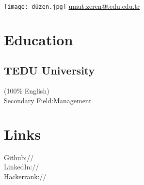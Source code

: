 \documentclass[]{deedy-resume-openfont}
\begin{document}
%
%
\lastupdated

%
%

\texttt{[image: düzen.jpg]} 
{ 
	  \href{umut.zeren@tedu.edu.tr}{umut.zeren@tedu.edu.tr}
}



%
%

\begin{minipage}[t]{0.32\textwidth} 


\section{Education} 

\subsection{TEDU University } \small{(100\% English)}\\[0.1cm]
Secondary Field:Management \\[0.1in]
\sectionsep






\sectionsep
\sectionsep
\sectionsep
\sectionsep
\sectionsep


\section{Links} 
Github:// \href{https://github.com/umutZeren}{} \\[0.10in]
LinkedIn://  \href{https://www.linkedin.com/in/umut-zeren-4405311a2/}{} \\[0.10in]
Hackerrank://\href{https://www.hackerrank.com/umutzerencs}{}
\sectionsep


\end{minipage}
\end{document}
